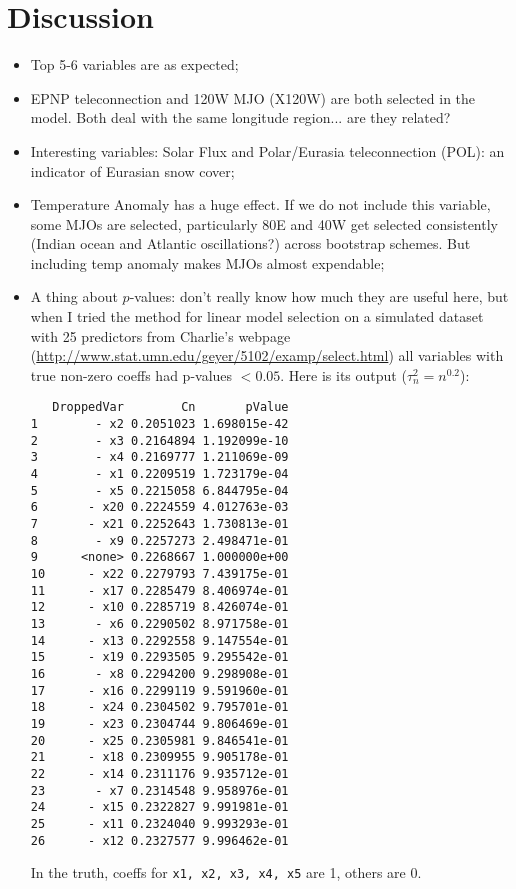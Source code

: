 \documentclass[fleqn,11pt]{article}
\begin{document}
\section{Discussion}
\begin{itemize}
\item Top 5-6 variables are as expected;
\item EPNP teleconnection and 120W MJO (X120W) are both selected in the model. Both deal with the same longitude region... are they related?
\item Interesting variables: Solar Flux and Polar/Eurasia teleconnection (POL): an indicator of Eurasian snow cover;
\item Temperature Anomaly has a huge effect. If we do not include this variable, some MJOs are selected, particularly 80E and 40W get selected consistently (Indian ocean and Atlantic oscillations?) across bootstrap schemes. But including temp anomaly makes MJOs almost expendable;
\item A thing about $p$-values: don't really know how much they are useful here, but when I tried the method for linear model selection on a simulated dataset with 25 predictors from Charlie's webpage (\url{http://www.stat.umn.edu/geyer/5102/examp/select.html}) all variables with true non-zero coeffs had p-values $<0.05$. Here is its output ($\tau_n^2 = n^{0.2}$):

\singlespacing
\begin{footnotesize}
\begin{verbatim}
   DroppedVar        Cn       pValue
1        - x2 0.2051023 1.698015e-42
2        - x3 0.2164894 1.192099e-10
3        - x4 0.2169777 1.211069e-09
4        - x1 0.2209519 1.723179e-04
5        - x5 0.2215058 6.844795e-04
6       - x20 0.2224559 4.012763e-03
7       - x21 0.2252643 1.730813e-01
8        - x9 0.2257273 2.498471e-01
9      <none> 0.2268667 1.000000e+00
10      - x22 0.2279793 7.439175e-01
11      - x17 0.2285479 8.406974e-01
12      - x10 0.2285719 8.426074e-01
13       - x6 0.2290502 8.971758e-01
14      - x13 0.2292558 9.147554e-01
15      - x19 0.2293505 9.295542e-01
16       - x8 0.2294200 9.298908e-01
17      - x16 0.2299119 9.591960e-01
18      - x24 0.2304502 9.795701e-01
19      - x23 0.2304744 9.806469e-01
20      - x25 0.2305981 9.846541e-01
21      - x18 0.2309955 9.905178e-01
22      - x14 0.2311176 9.935712e-01
23       - x7 0.2314548 9.958976e-01
24      - x15 0.2322827 9.991981e-01
25      - x11 0.2324040 9.993293e-01
26      - x12 0.2327577 9.996462e-01
\end{verbatim}
\end{footnotesize}

\doublespacing
In the truth, coeffs for \texttt{x1, x2, x3, x4, x5} are 1, others are 0.
\end{itemize}
\end{document}

